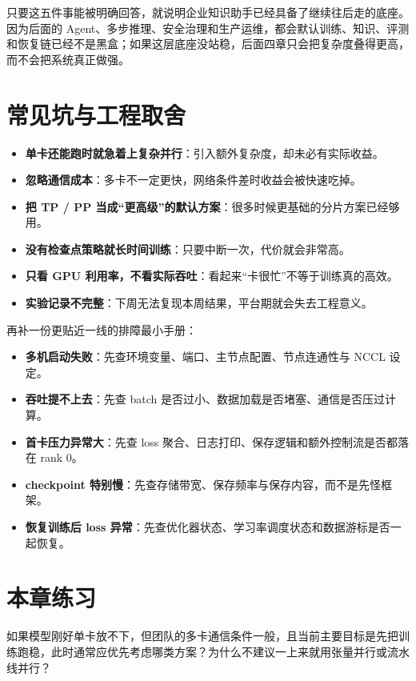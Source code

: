 只要这五件事能被明确回答，就说明企业知识助手已经具备了继续往后走的底座。因为后面的 Agent、多步推理、安全治理和生产运维，都会默认训练、知识、评测和恢复链已经不是黑盒；如果这层底座没站稳，后面四章只会把复杂度叠得更高，而不会把系统真正做强。

\section{常见坑与工程取舍}
\begin{itemize}
  \item \textbf{单卡还能跑时就急着上复杂并行}：引入额外复杂度，却未必有实际收益。
  \item \textbf{忽略通信成本}：多卡不一定更快，网络条件差时收益会被快速吃掉。
  \item \textbf{把 TP / PP 当成“更高级”的默认方案}：很多时候更基础的分片方案已经够用。
  \item \textbf{没有检查点策略就长时间训练}：只要中断一次，代价就会非常高。
  \item \textbf{只看 GPU 利用率，不看实际吞吐}：看起来“卡很忙”不等于训练真的高效。
  \item \textbf{实验记录不完整}：下周无法复现本周结果，平台期就会失去工程意义。
\end{itemize}

再补一份更贴近一线的排障最小手册：
\begin{itemize}
  \item \textbf{多机启动失败}：先查环境变量、端口、主节点配置、节点连通性与 NCCL 设定。
  \item \textbf{吞吐提不上去}：先查 batch 是否过小、数据加载是否堵塞、通信是否压过计算。
  \item \textbf{首卡压力异常大}：先查 loss 聚合、日志打印、保存逻辑和额外控制流是否都落在 rank 0。
  \item \textbf{checkpoint 特别慢}：先查存储带宽、保存频率与保存内容，而不是先怪框架。
  \item \textbf{恢复训练后 loss 异常}：先查优化器状态、学习率调度状态和数据游标是否一起恢复。
\end{itemize}

\section{本章练习}
\begin{exercise}[并行策略选择]
如果模型刚好单卡放不下，但团队的多卡通信条件一般，且当前主要目标是先把训练跑稳，此时通常应优先考虑哪类方案？为什么不建议一上来就用张量并行或流水线并行？
\end{exercise}

